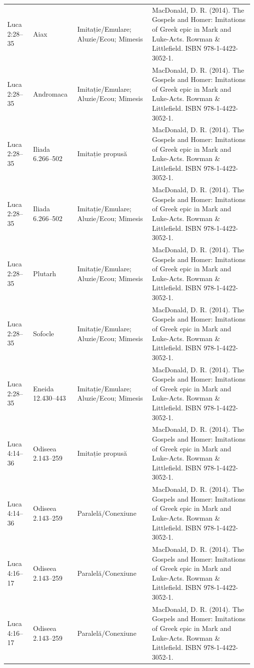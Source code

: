 \documentclass[12pt,a4paper,twoside,openany]{book}
\begin{document}
\begin{longtable}{L{1.4cm}L{1.7cm}L{3.1cm}L{8.4cm}}
Luca 2:28–35 & Aiax & Imitație/Emulare; Aluzie/Ecou; Mimesis & MacDonald, D. R. (2014). The Gospels and Homer: Imitations of Greek epic in Mark and Luke-Acts. Rowman \& Littlefield. ISBN 978-1-4422-3052-1. \\
Luca 2:28–35 & Andromaca & Imitație/Emulare; Aluzie/Ecou; Mimesis & MacDonald, D. R. (2014). The Gospels and Homer: Imitations of Greek epic in Mark and Luke-Acts. Rowman \& Littlefield. ISBN 978-1-4422-3052-1. \\
Luca 2:28–35 & Iliada 6.266–502 & Imitație propusă & MacDonald, D. R. (2014). The Gospels and Homer: Imitations of Greek epic in Mark and Luke-Acts. Rowman \& Littlefield. ISBN 978-1-4422-3052-1. \\
Luca 2:28–35 & Iliada 6.266–502 & Imitație/Emulare; Aluzie/Ecou; Mimesis & MacDonald, D. R. (2014). The Gospels and Homer: Imitations of Greek epic in Mark and Luke-Acts. Rowman \& Littlefield. ISBN 978-1-4422-3052-1. \\
Luca 2:28–35 & Plutarh & Imitație/Emulare; Aluzie/Ecou; Mimesis & MacDonald, D. R. (2014). The Gospels and Homer: Imitations of Greek epic in Mark and Luke-Acts. Rowman \& Littlefield. ISBN 978-1-4422-3052-1. \\
Luca 2:28–35 & Sofocle & Imitație/Emulare; Aluzie/Ecou; Mimesis & MacDonald, D. R. (2014). The Gospels and Homer: Imitations of Greek epic in Mark and Luke-Acts. Rowman \& Littlefield. ISBN 978-1-4422-3052-1. \\
Luca 2:28–35 & Eneida 12.430–443 & Imitație/Emulare; Aluzie/Ecou; Mimesis & MacDonald, D. R. (2014). The Gospels and Homer: Imitations of Greek epic in Mark and Luke-Acts. Rowman \& Littlefield. ISBN 978-1-4422-3052-1. \\
Luca 4:14–36 & Odiseea 2.143–259 & Imitație propusă & MacDonald, D. R. (2014). The Gospels and Homer: Imitations of Greek epic in Mark and Luke-Acts. Rowman \& Littlefield. ISBN 978-1-4422-3052-1. \\
Luca 4:14–36 & Odiseea 2.143–259 & Paralelă/Conexiune & MacDonald, D. R. (2014). The Gospels and Homer: Imitations of Greek epic in Mark and Luke-Acts. Rowman \& Littlefield. ISBN 978-1-4422-3052-1. \\
Luca 4:16–17 & Odiseea 2.143–259 & Paralelă/Conexiune & MacDonald, D. R. (2014). The Gospels and Homer: Imitations of Greek epic in Mark and Luke-Acts. Rowman \& Littlefield. ISBN 978-1-4422-3052-1. \\
Luca 4:16–17 & Odiseea 2.143–259 & Paralelă/Conexiune & MacDonald, D. R. (2014). The Gospels and Homer: Imitations of Greek epic in Mark and Luke-Acts. Rowman \& Littlefield. ISBN 978-1-4422-3052-1. \\

\end{longtable}
\end{document}
